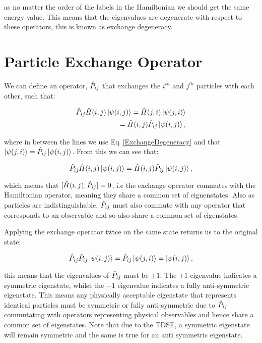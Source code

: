 \noindent as no matter the order of the labels in the Hamiltonian we should get the same energy value. This means that the eigenvalues are degenerate with respect to these operators, this is known as exchange degeneracy.

\section{Particle Exchange Operator}

We can define an operator, $\Hat{P}_{ij}$ that exchanges the $i^{th}$ and $j^{th}$ particles with each other, such that:

\begin{eqnarray}
    \Hat{P}_{ij} \Hat{H}(i, j) \ket{\psi(i, j)} = \Hat{H}(j, i) \ket{\psi(j, i)} \\
    \hspace{15mm} =\Hat{H}(i, j) \Hat{P}_{ij} \ket{\psi(i, j)},
\end{eqnarray}

\noindent where in between the lines we use Eq~\ref{ExchangeDegeneracy} and that $\ket{\psi(j, i)} = \Hat{P}_{ij} \ket{\psi(i, j)}$. From this we can see that:

\begin{equation}
    \Hat{P}_{ij} \Hat{H}(i, j) \ket{\psi(i, j)} = \Hat{H}(i, j) \Hat{P}_{ij} \ket{\psi(i, j)},
    \label{ExchangeOperatorCommutator}
\end{equation}

\noindent which means that $[\Hat{H}(i, j), \Hat{P}_{ij}] = 0$, i.e the exchange operator commutes with the Hamiltonian operator, meaning they share a common set of eignenstates. Also as particles are indistinguishable, $\Hat{P}_{ij}$ must also commute with any operator that corresponds to an observable and so also share a common set of eigenstates.

\noindent Applying the exchange operator twice on the same state returns us to the original state:

\begin{equation}
    \Hat{P}_{ij} \Hat{P}_{ij} \ket{\psi(i, j)} = \Hat{P}_{ij} \ket{\psi(j, i)} = \ket{\psi(i, j)},
\end{equation}

\noindent this means that the eigenvalues of $\Hat{P}_{ij}$ must be $\pm1$. The $+1$ eigenvalue indicates a symmetric eigenstate, whilst the $-1$ eigenvalue indicates a fully anti-symmetric eigenstate. This means any physically acceptable eigenstate that represents identical particles must be symmetric or fully anti-symmetric due to $\Hat{P}_{ij}$ commutating with operators representing physical observables and hence share a common set of eigenstates. Note that due to the TDSE, a symmetric eigenstate will remain symmetric and the same is true for an anti symmetric eigenstate.

